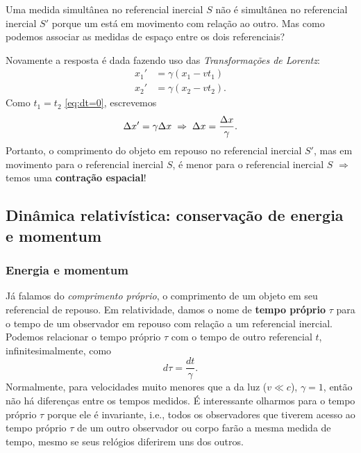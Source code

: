 \documentclass[12pt,a4paper,titlepage,brazil]{article}
\begin{document}
Uma medida simultânea no referencial inercial $S$ não é simultânea no referencial inercial $S'$ porque um está em movimento com relação ao outro. Mas como podemos associar as medidas de espaço entre os dois referenciais?

Novamente a resposta é dada fazendo uso das {\em Transformações de Lorentz}:
\begin{align}
 x_1' & = \gamma \left(x_1 - v t_1\right)\\
 x_2' & = \gamma \left(x_2 - v t_2\right) .
\end{align}
Como $t_1 = t_2$ \ref{eq:dt=0}, escrevemos
\begin{equation}
 \Delta x' = \gamma \Delta x \hspace{0.1cm}\Rightarrow\hspace{0.1cm} \Delta x = \frac{\Delta x}{\gamma} .
\end{equation}
Portanto, o comprimento do objeto em repouso no referencial inercial $S'$, mas em movimento para o referencial inercial $S$, é menor para o referencial inercial $S$ $\Rightarrow$ temos uma {\bf contração espacial}!


\subsection{Dinâmica relativística: conservação de energia e momentum}

\subsubsection{Energia e momentum}

Já falamos do {\em comprimento próprio}, o comprimento de um objeto em seu referencial de repouso. Em relatividade, damos o nome de {\bf tempo próprio} $\tau$ para o tempo de um observador em repouso com relação a um referencial inercial. Podemos relacionar o tempo próprio $\tau$ com o tempo de outro referencial $t$, infinitesimalmente, como
\begin{equation}
 d \tau = \frac{d t}{\gamma} .
\end{equation}
Normalmente, para velocidades muito menores que a da luz ($v \ll c$), $\gamma = 1$, então não há diferenças entre os tempos medidos. É interessante olharmos para o tempo próprio $\tau$ porque ele é invariante, i.e., todos os observadores que tiverem acesso ao tempo próprio $\tau$ de um outro observador ou corpo farão a mesma medida de tempo, mesmo se seus relógios diferirem uns dos outros.
\end{document}

